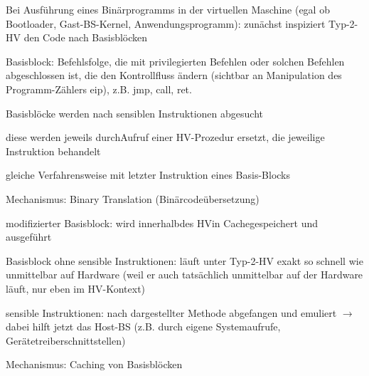 \documentclass[a4paper]{article}
\begin{document}
\begin{multicols}{3}
    \begin{itemize*}
        \item Bei Ausführung eines Binärprogramms in der virtuellen Maschine (egal
        ob Bootloader, Gast-BS-Kernel, Anwendungsprogramm): zunächst
        inspiziert Typ-2-HV den Code nach Basisblöcken
        \begin{itemize*}
            \item Basisblock: Befehlsfolge, die mit privilegierten Befehlen oder solchen Befehlen abgeschlossen ist, die den Kontrollfluss ändern (sichtbar an Manipulation des Programm-Zählers eip), z.B. jmp, call, ret.
        \end{itemize*}
        \item Basisblöcke werden nach sensiblen Instruktionen abgesucht
        \item diese werden jeweils durchAufruf einer HV-Prozedur ersetzt, die
        jeweilige Instruktion behandelt
        \item gleiche Verfahrensweise mit letzter Instruktion eines Basis-Blocks
    \end{itemize*}

    Mechanismus: Binary Translation (Binärcodeübersetzung)

    \begin{itemize*}
        \item modifizierter Basisblock: wird innerhalbdes HVin Cachegespeichert und
        ausgeführt
        \item Basisblock ohne sensible Instruktionen: läuft unter Typ-2-HV exakt so
        schnell wie unmittelbar auf Hardware (weil er auch tatsächlich
        unmittelbar auf der Hardware läuft, nur eben im HV-Kontext)
        \item sensible Instruktionen: nach dargestellter Methode abgefangen und
        emuliert $\rightarrow$ dabei hilft jetzt das Host-BS
        (z.B. durch eigene Systemaufrufe, Gerätetreiberschnittstellen)
    \end{itemize*}

    Mechanismus: Caching von Basisblöcken


\end{multicols}
\end{document}
